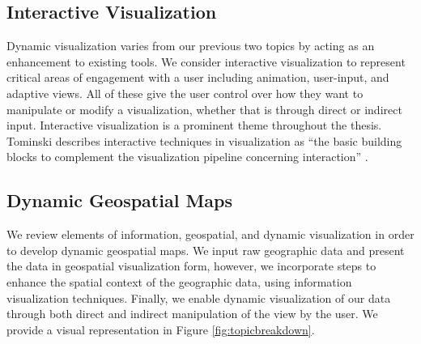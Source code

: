 \newpage

\subsection{Interactive Visualization}
Dynamic visualization varies from our previous two topics by acting as an enhancement to existing tools. We consider interactive visualization to represent critical areas of engagement with a user including animation, user-input, and adaptive views. All of these give the user control over how they want to manipulate or modify a visualization, whether that is through direct or indirect input. Interactive visualization is a prominent theme throughout the thesis. Tominski describes interactive techniques in visualization as ``the basic building blocks to complement the visualization pipeline concerning interaction'' \cite{tominski2015interaction}.

\subsection{Dynamic Geospatial Maps}
We review elements of information, geospatial, and dynamic visualization in order to develop dynamic geospatial maps. We input raw geographic data and present the data in geospatial visualization form, however, we incorporate steps to enhance the spatial context of the geographic data, using information visualization techniques. Finally, we enable dynamic visualization of our data through both direct and indirect manipulation of the view by the user. We provide a visual representation in Figure \ref{fig:topicbreakdown}.
\vspace{1.2cm}

